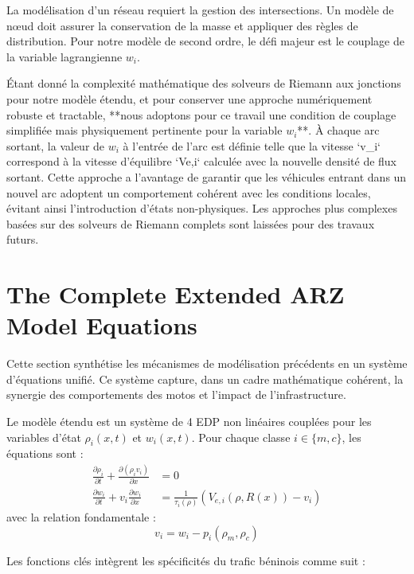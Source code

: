 La modélisation d'un réseau requiert la gestion des intersections. Un modèle de nœud doit assurer la conservation de la masse et appliquer des règles de distribution. Pour notre modèle de second ordre, le défi majeur est le couplage de la variable lagrangienne \( w_i \).

Étant donné la complexité mathématique des solveurs de Riemann aux jonctions pour notre modèle étendu, et pour conserver une approche numériquement robuste et tractable, **nous adoptons pour ce travail une condition de couplage simplifiée mais physiquement pertinente pour la variable \(w_i\)**. À chaque arc sortant, la valeur de \(w_i\) à l'entrée de l'arc est définie telle que la vitesse `v_i` correspond à la vitesse d'équilibre `Ve,i` calculée avec la nouvelle densité de flux sortant. Cette approche a l'avantage de garantir que les véhicules entrant dans un nouvel arc adoptent un comportement cohérent avec les conditions locales, évitant ainsi l'introduction d'états non-physiques. Les approches plus complexes basées sur des solveurs de Riemann complets sont laissées pour des travaux futurs.

\section{The Complete Extended ARZ Model Equations}
\label{sec:complete_model_equations}

Cette section synthétise les mécanismes de modélisation précédents en un système d'équations unifié. Ce système capture, dans un cadre mathématique cohérent, la synergie des comportements des motos et l'impact de l'infrastructure.

Le modèle étendu est un système de 4 EDP non linéaires couplées pour les variables d'état \(\rho_i(x, t)\) et \(w_i(x, t)\). Pour chaque classe \(i \in \{m, c\}\), les équations sont :
\begin{align}
    \label{eq:full_mass_i}
    \frac{\partial \rho_i}{\partial t} + \frac{\partial (\rho_i v_i)}{\partial x} &= 0 \\
    \label{eq:full_momentum_i}
    \frac{\partial w_i}{\partial t} + v_i \frac{\partial w_i}{\partial x} &= \frac{1}{\tau_i(\rho)} (V_{e,i}(\rho, R(x)) - v_i)
\end{align}
avec la relation fondamentale :
\begin{equation}
    \label{eq:full_vi_wi_pi}
    v_i = w_i - p_i(\rho_m, \rho_c)
\end{equation}

Les fonctions clés intègrent les spécificités du trafic béninois comme suit :

